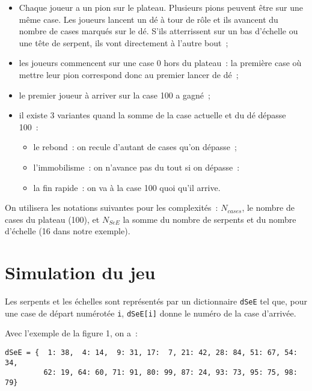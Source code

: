 \begin{itemize}
	\item Chaque joueur a un pion sur le plateau. Plusieurs pions peuvent être sur une même case. Les joueurs lancent un dé à tour de rôle et ils avancent du nombre de cases marqués sur le dé. S'ils atterrissent sur un bas d'échelle ou une tête de serpent, ils vont directement à l'autre bout~;
	\item les joueurs commencent sur une case 0 hors du plateau~: la première case où mettre leur pion correspond donc au premier lancer de dé~;
	\item le premier joueur à arriver sur la case 100 a gagné~; 
	\item il existe 3 variantes quand la somme de la case actuelle et du dé dépasse 100~:
	\begin{itemize}
		\item le rebond~: on recule d'autant de cases qu'on dépasse~;
		\item l'immobilisme~: on n'avance pas du tout si on dépasse~: 
		\item la fin rapide~: on va à la case 100 quoi qu'il arrive. 
	\end{itemize}
\end{itemize}

On utilisera les notations suivantes pour les complexités~: $N_{cases}$, le nombre de cases du plateau (100), et $N_{SeE}$ la somme du nombre de serpents et du nombre d'échelle (16 dans notre exemple).

\section{Simulation du jeu}



Les serpents et les échelles sont représentés par un dictionnaire \texttt{dSeE} tel que, pour une case de départ numérotée \texttt{i}, \texttt{dSeE[i]} donne le numéro de la case d'arrivée.

Avec l'exemple de la figure 1, on a~: 
\begin{lstlisting}
dSeE = {  1: 38,  4: 14,  9: 31, 17:  7, 21: 42, 28: 84, 51: 67, 54: 34, 
         62: 19, 64: 60, 71: 91, 80: 99, 87: 24, 93: 73, 95: 75, 98: 79}
\end{lstlisting}

